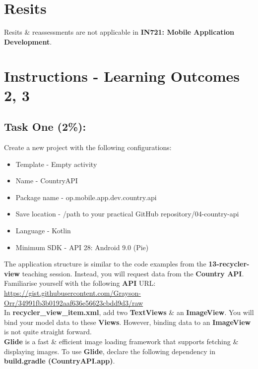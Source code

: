 \documentclass{article}
\begin{document}
\section*{Resits}
Resits \& reassessments are not applicable in \textbf{IN721: Mobile Application Development}.

\section*{Instructions - Learning Outcomes 2, 3}
\subsection*{Task One (2\%):}
Create a new project with the following configurations:
\begin{itemize}
	\item Template - Empty activity
	\item Name - CountryAPI
	\item Package name - op.mobile.app.dev.country.api
	\item Save location - /path to your practical GitHub repository/04-country-api
	\item Language - Kotlin
	\item Minimum SDK - API 28: Android 9.0 (Pie) 
\end{itemize} 

The application structure is similar to the code examples from the \textbf{13-recycler-view} teaching session. Instead, you will request data from the \textbf{Country API}. \\

Familiarise yourself with the following \textbf{API} URL: \\

\href{https://gist.githubusercontent.com/Grayson-Orr/34991fb3b0192aaf636e56623cbdd9d3/raw}{https://gist.githubusercontent.com/Grayson-Orr/34991fb3b0192aaf636e56623cbdd9d3/raw} \\

In \textbf{recycler\_view\_item.xml}, add two \textbf{TextViews} \& an \textbf{ImageView}. You will bind your model data to these \textbf{Views}. However, binding data to an \textbf{ImageView} is not quite straight forward.  \\

\textbf{Glide} is a fast \& efficient image loading framework that supports fetching \& displaying images. To use \textbf{Glide}, declare the following dependency in \textbf{build.gradle (CountryAPI.app)}.
\end{document}
